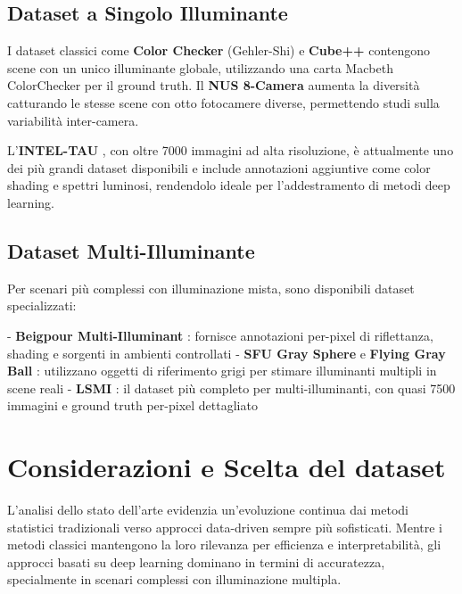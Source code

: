 \subsection{Dataset a Singolo Illuminante}

I dataset classici come \textbf{Color Checker} (Gehler-Shi) \cite{gehler_bayesian_2008} e \textbf{Cube++} \cite{ershov_cube_2020} contengono scene con un unico illuminante globale, utilizzando una carta Macbeth ColorChecker per il ground truth. Il \textbf{NUS 8-Camera} \cite{cheng_illuminant_2014} aumenta la diversità catturando le stesse scene con otto fotocamere diverse, permettendo studi sulla variabilità inter-camera.

L'\textbf{INTEL-TAU} \cite{laakom_intel-tau_2020}, con oltre 7000 immagini ad alta risoluzione, è attualmente uno dei più grandi dataset disponibili e include annotazioni aggiuntive come color shading e spettri luminosi, rendendolo ideale per l'addestramento di metodi deep learning.

\subsection{Dataset Multi-Illuminante}

Per scenari più complessi con illuminazione mista, sono disponibili dataset specializzati:

- \textbf{Beigpour Multi-Illuminant} \cite{beigpour_multi-illuminant_2013}: fornisce annotazioni per-pixel di riflettanza, shading e sorgenti in ambienti controllati
- \textbf{SFU Gray Sphere} e \textbf{Flying Gray Ball} \cite{ciurea_large_2003,aghaei_flying_2020}: utilizzano oggetti di riferimento grigi per stimare illuminanti multipli in scene reali
- \textbf{LSMI} \cite{kim_large_2021}: il dataset più completo per multi-illuminanti, con quasi 7500 immagini e ground truth per-pixel dettagliato

\section{Considerazioni e Scelta del dataset}\label{sec:scelta_dataset}

L'analisi dello stato dell'arte evidenzia un'evoluzione continua dai metodi statistici tradizionali verso approcci data-driven sempre più sofisticati. Mentre i metodi classici mantengono la loro rilevanza per efficienza e interpretabilità, gli approcci basati su deep learning dominano in termini di accuratezza, specialmente in scenari complessi con illuminazione multipla.

